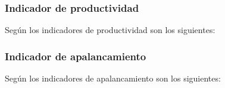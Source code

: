 


\subsubsection{Indicador de productividad}
Seg\'un \cite{cruz} los indicadores de productividad son los siguientes:




\subsubsection{Indicador de apalancamiento}
Seg\'un \cite{cruz} los indicadores de apalancamiento son los siguientes:


